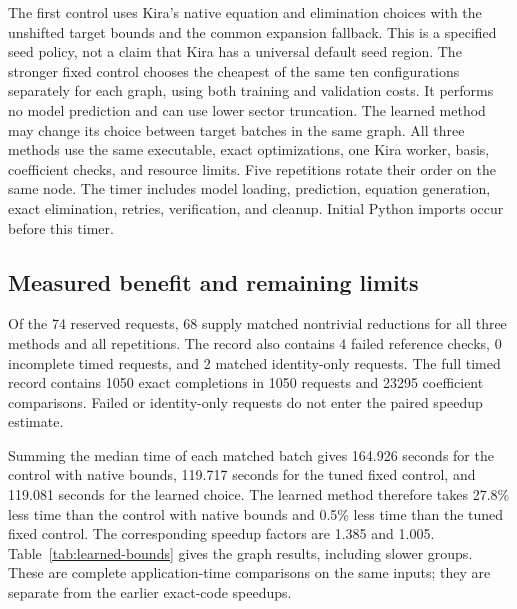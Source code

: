 The first control uses Kira's native equation and elimination choices with the unshifted target bounds and the common expansion fallback. This is a specified seed policy, not a claim that Kira has a universal default seed region. The stronger fixed control chooses the cheapest of the same ten configurations separately for each graph, using both training and validation costs. It performs no model prediction and can use lower sector truncation. The learned method may change its choice between target batches in the same graph. All three methods use the same executable, exact optimizations, one Kira worker, basis, coefficient checks, and resource limits. Five repetitions rotate their order on the same node. The timer includes model loading, prediction, equation generation, exact elimination, retries, verification, and cleanup. Initial Python imports occur before this timer.

\subsection{Measured benefit and remaining limits}
Of the 74 reserved requests, 68 supply matched nontrivial reductions for all three methods and all repetitions. The record also contains 4 failed reference checks, 0 incomplete timed requests, and 2 matched identity-only requests. The full timed record contains 1050 exact completions in 1050 requests and 23295 coefficient comparisons. Failed or identity-only requests do not enter the paired speedup estimate.

Summing the median time of each matched batch gives 164.926 seconds for the control with native bounds, 119.717 seconds for the tuned fixed control, and 119.081 seconds for the learned choice. The learned method therefore takes 27.8\% less time than the control with native bounds and 0.5\% less time than the tuned fixed control. The corresponding speedup factors are 1.385 and 1.005. Table~\ref{tab:learned-bounds} gives the graph results, including slower groups. These are complete application-time comparisons on the same inputs; they are separate from the earlier exact-code speedups.

